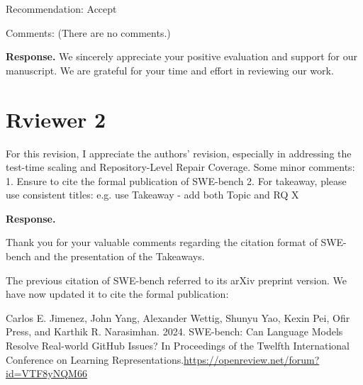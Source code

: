 \documentclass[acmsmall]{acmart}
\begin{document}
	\begin{tcolorbox}
		[commentbox,title=Reviewer \#1 - Comment 1] Recommendation: Accept

		Comments: (There are no comments.)
	\end{tcolorbox}

	\noindent
	\textbf{Response.} We sincerely appreciate your positive evaluation and support for our manuscript.
	We are grateful for your time and effort in reviewing our work.


	\section{Rviewer 2}

	\begin{tcolorbox}
		[commentbox,title=Reviewer \#2 - Comment 1] For this revision, I appreciate the authors'
		revision, especially in addressing the test-time scaling and Repository-Level Repair Coverage.
		Some minor comments: 1. Ensure to cite the formal publication of SWE-bench 2. For takeaway,
		please use consistent titles: e.g. use Takeaway - add both Topic and RQ X
	\end{tcolorbox}

	\noindent
	\textbf{Response.}

	Thank you for your valuable comments regarding the citation format of SWE-bench and the presentation
	of the Takeaways.




	The previous citation of SWE-bench referred to its arXiv preprint version. We have now updated it
	to cite the formal publication:

	\color{blue}
	Carlos E. Jimenez, John Yang, Alexander Wettig, Shunyu Yao, Kexin Pei, Ofir Press, and Karthik R.
	Narasimhan. 2024. SWE-bench: Can Language Models Resolve Real-world GitHub Issues? In
	Proceedings of the Twelfth International Conference on Learning Representations.\url{https://openreview.net/forum?id=VTF8yNQM66}
	\color{black}
\end{document}
